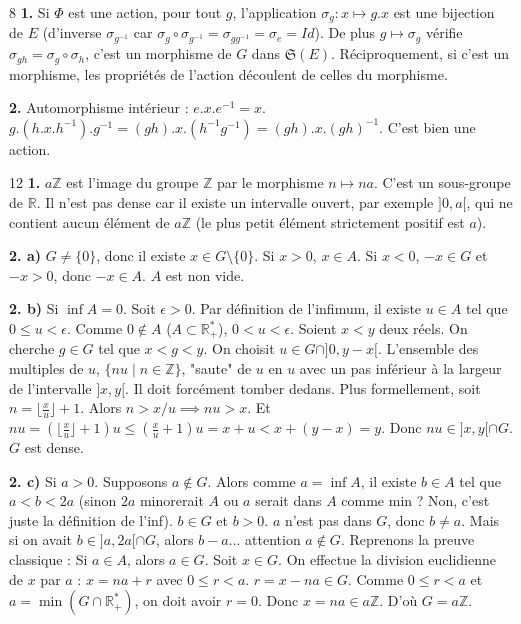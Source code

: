 \begin{correction}{8}
\textbf{1.} Si $\Phi$ est une action, pour tout $g$, l'application $\sigma_g : x \mapsto g.x$ est une bijection de $E$ (d'inverse $\sigma_{g^{-1}}$ car $\sigma_g \circ \sigma_{g^{-1}} = \sigma_{gg^{-1}} = \sigma_e = Id$).
De plus $g \mapsto \sigma_g$ vérifie $\sigma_{gh} = \sigma_g \circ \sigma_h$, c'est un morphisme de $G$ dans $\mathfrak{S}(E)$.
Réciproquement, si c'est un morphisme, les propriétés de l'action découlent de celles du morphisme.

\textbf{2.} Automorphisme intérieur :
$e.x.e^{-1} = x$.
$g.(h.x.h^{-1}).g^{-1} = (gh).x.(h^{-1}g^{-1}) = (gh).x.(gh)^{-1}$.
C'est bien une action.
\end{correction}

\begin{correction}{12}
\textbf{1.} $a\mathbb{Z}$ est l'image du groupe $\mathbb{Z}$ par le morphisme $n \mapsto na$. C'est un sous-groupe de $\mathbb{R}$.
Il n'est pas dense car il existe un intervalle ouvert, par exemple $]0, a[$, qui ne contient aucun élément de $a\mathbb{Z}$ (le plus petit élément strictement positif est $a$).

\textbf{2. a)} $G \neq \{0\}$, donc il existe $x \in G \setminus \{0\}$. Si $x > 0$, $x \in A$. Si $x < 0$, $-x \in G$ et $-x > 0$, donc $-x \in A$. $A$ est non vide.

\textbf{2. b)} Si $\inf A = 0$. Soit $\epsilon > 0$. Par définition de l'infimum, il existe $u \in A$ tel que $0 \le u < \epsilon$. Comme $0 \notin A$ ($A \subset \mathbb{R}^*_+$), $0 < u < \epsilon$.
Soient $x < y$ deux réels. On cherche $g \in G$ tel que $x < g < y$.
On choisit $u \in G \cap ]0, y-x[$.
L'ensemble des multiples de $u$, $\{nu \mid n \in \mathbb{Z}\}$, "saute" de $u$ en $u$ avec un pas inférieur à la largeur de l'intervalle $]x,y[$. Il doit forcément tomber dedans.
Plus formellement, soit $n = \lfloor \frac{x}{u} \rfloor + 1$. Alors $n > x/u \implies nu > x$.
Et $nu = (\lfloor \frac{x}{u} \rfloor + 1) u \le (\frac{x}{u} + 1)u = x + u < x + (y-x) = y$.
Donc $nu \in ]x,y[ \cap G$. $G$ est dense.

\textbf{2. c)} Si $a > 0$. Supposons $a \notin G$. Alors comme $a = \inf A$, il existe $b \in A$ tel que $a < b < 2a$ (sinon $2a$ minorerait $A$ ou $a$ serait dans $A$ comme min ? Non, c'est juste la définition de l'inf).
$b \in G$ et $b > 0$. $a$ n'est pas dans $G$, donc $b \neq a$.
Mais si on avait $b \in ]a, 2a[ \cap G$, alors $b-a$... attention $a \notin G$.
Reprenons la preuve classique :
Si $a \in A$, alors $a \in G$.
Soit $x \in G$. On effectue la division euclidienne de $x$ par $a$ : $x = n a + r$ avec $0 \le r < a$.
$r = x - na \in G$. Comme $0 \le r < a$ et $a = \min(G \cap \mathbb{R}^*_+)$, on doit avoir $r=0$.
Donc $x = na \in a\mathbb{Z}$. D'où $G = a\mathbb{Z}$.


\end{correction}
